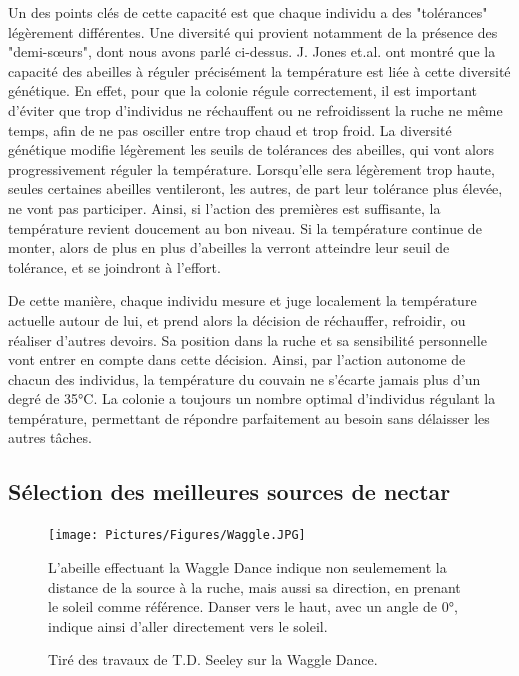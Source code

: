 			Un des points clés de cette capacité est que chaque individu a des "tolérances" légèrement différentes. Une diversité qui provient notamment de la présence des "demi-sœurs", dont nous avons parlé ci-dessus. J. Jones et.al. \cite{jones_honey_2004} ont montré que la capacité des abeilles à réguler précisément la température est liée à cette diversité génétique. En effet, pour que la colonie régule correctement, il est important d'éviter que trop d'individus ne réchauffent ou ne refroidissent la ruche ne même temps, afin de ne pas osciller entre trop chaud et trop froid. La diversité génétique modifie légèrement les seuils de tolérances des abeilles, qui vont alors progressivement réguler la température. Lorsqu'elle sera légèrement trop haute, seules certaines abeilles ventileront, les autres, de part leur tolérance plus élevée, ne vont pas participer. Ainsi, si l'action des premières est suffisante, la température revient doucement au bon niveau. Si la température continue de monter, alors de plus en plus d'abeilles la verront atteindre leur seuil de tolérance, et se joindront à l'effort.
			
			De cette manière, chaque individu mesure et juge localement la température actuelle autour de lui, et prend alors la décision de réchauffer, refroidir, ou réaliser d'autres devoirs. Sa position dans la ruche et sa sensibilité personnelle vont entrer en compte dans cette décision. Ainsi, par l'action autonome de chacun des individus, la température du couvain ne s'écarte jamais plus d'un degré de 35°C. La colonie a toujours un nombre optimal d'individus régulant la température, permettant de répondre parfaitement au besoin sans délaisser les autres tâches.
			
			\subsection{Sélection des meilleures sources de nectar}
			
			\begin{figure}
			\centering
			\texttt{[image: Pictures/Figures/Waggle.JPG]}
				\caption{Tiré des travaux de T.D. Seeley \cite{seeley_wisdom_1995} sur la Waggle Dance.}{ L'abeille effectuant la Waggle Dance indique non seulemement la distance de la source à la ruche, mais aussi sa direction, en prenant le soleil comme référence. Danser vers le haut, avec un angle de 0°, indique ainsi d'aller directement vers le soleil.}
			\label{Waggle}
			\end{figure}
			
